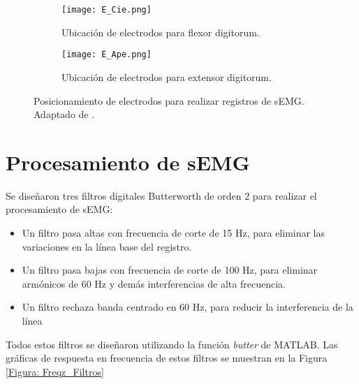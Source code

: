 \vfill
\begin{figure}[htbp]
	\centering
	\begin{subfigure}[htbp]{0.3\textwidth}
		\texttt{[image: E\_Cie.png]}
		\caption{Ubicación de electrodos para flexor digitorum.}
		\label{Figura: E_Cie}
	\end{subfigure}
	\hspace{3cm}
	\begin{subfigure}[htbp]{0.3\textwidth}
		\texttt{[image: E\_Ape.png]}
		\caption{Ubicación de electrodos para extensor digitorum.}
		\label{Figura: E_Ape}
	\end{subfigure}
	\caption[Posicionamiento de electrodos para registro de sEMG]{Posicionamiento de electrodos para realizar registros de sEMG. Adaptado de \cite{Cavalcanti-Garcia2009}.}
	\label{Figura: E_sEMG}
\end{figure}
\vfill

\newpage
\section{Procesamiento de sEMG} \label{Sec: Procesamiento}
Se diseñaron tres filtros digitales Butterworth de orden 2 para realizar el procesamiento de sEMG:

\begin{itemize}
	\item Un filtro pasa altas con frecuencia de corte de 15 Hz, para eliminar las variaciones en la línea base del registro.
	\item Un filtro pasa bajas con frecuencia de corte de 100 Hz, para eliminar armónicos de 60 Hz y demás interferencias de alta frecuencia.
	\item Un filtro rechaza banda centrado en 60 Hz, para reducir la interferencia de la línea
\end{itemize}

Todos estos filtros se diseñaron utilizando la función \emph{butter} de MATLAB\textregistered. Las gráficas de respuesta en frecuencia de estos filtros se muestran en la Figura \ref{Figura: Freqz_Filtros} %

